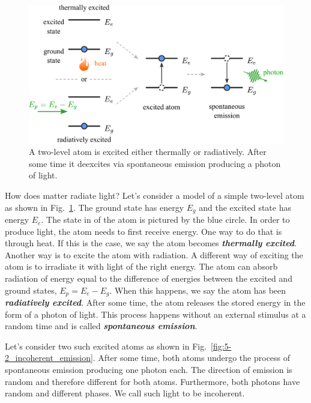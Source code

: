 \begin{figure}
    \centering
    \includegraphics[width=\textwidth]{lesson5/5-2_spontaneous_emission.pdf}
    \caption[Spontaneous emission]{A two-level atom is excited either thermally or radiatively. After some time it deexcites via spontaneous emission producing a photon of light.}
    \label{fig:5-2_spontaneous_emission}
\end{figure}

How does matter radiate light?
Let's consider a model of a simple two-level atom as shown in Fig.~\ref{fig:5-2_spontaneous_emission}.
The ground state has energy $E_g$ and the excited state has energy $E_e$.
The state in of the atom is pictured by the blue circle.
In order to produce light, the atom needs to first receive energy.
One way to do that is through heat.
If this is the case, we say the atom becomes \textit{\textbf{thermally excited}}.
Another way is to excite the atom with radiation.
A different way of exciting the atom is to irradiate it with light of the right energy.
The atom can absorb radiation of energy equal to the difference of energies between the excited and ground states, $E_p = E_e - E_g$.
When this happens, we say the atom has been \textit{\textbf{radiatively excited}}.
After some time, the atom releases the stored energy in the form of a photon of light.
This process happens without an external stimulus at a random time and is called \textit{\textbf{spontaneous emission}}.

Let's consider two such excited atoms as shown in Fig.~\ref{fig:5-2_incoherent_emission}.
After some time, both atoms undergo the process of spontaneous emission producing one photon each.
The direction of emission is random and therefore different for both atoms.
Furthermore, both photons have random and different phases.
We call such light to be incoherent.

